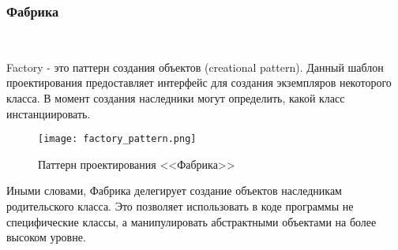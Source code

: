 \subsubsection{Фабрика}
\

Factory - это паттерн создания объектов (creational pattern). Данный шаблон проектирования предоставляет интерфейс для создания экземпляров некоторого класса. В момент создания наследники могут определить, какой класс инстанциировать.

\begin{figure}[ht]
\centering
    \texttt{[image: factory\_pattern.png]}
    \caption{Паттерн проектирования <<Фабрика>>}
    \label{sec:modeling:factory}
\end{figure}

Иными словами, Фабрика делегирует создание объектов наследникам родительского класса. Это позволяет использовать в коде программы не специфические классы, а манипулировать абстрактными объектами на более высоком уровне.